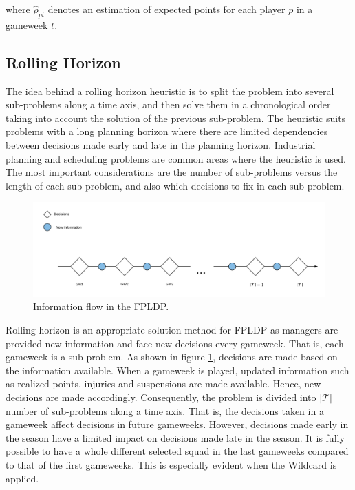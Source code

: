 where $\hat{\rho}_{pt}$ denotes an estimation of expected points for each player $p$ in a gameweek $t$.

\newpar



\subsection{Rolling Horizon}

The idea behind a rolling horizon heuristic is to split the problem into several sub-problems along a time axis, and then solve them in a chronological order taking into account the solution of the previous sub-problem. The heuristic suits problems with a long planning horizon where there are limited dependencies between decisions made early and late in the planning horizon. Industrial planning and scheduling problems are common areas where the heuristic is used. The most important considerations are the number of sub-problems versus the length of each sub-problem, and also which decisions to fix in each sub-problem. 

\begin{figure}[H]
    \centering
    \includegraphics[scale = 0.47]{fig/chapter_5/Rolling_Horizon_Information_Flow.png}
    \caption{Information flow in the FPLDP.}
    \label{fig:information_flow}
\end{figure}

Rolling horizon is an appropriate solution method for FPLDP as managers are provided new information and face new decisions every gameweek. That is, each gameweek is a sub-problem. As shown in figure \ref{fig:information_flow}, decisions are made based on the information available. When a gameweek is played, updated information such as realized points, injuries and suspensions are made available. Hence, new decisions are made accordingly. Consequently, the problem is divided into $\mathcal{|T|}$ number of sub-problems along a time axis. That is, the decisions taken in a gameweek affect decisions in future gameweeks. However, decisions made early in the season have a limited impact on decisions made late in the season. It is fully possible to have a whole different selected squad in the last gameweeks compared to that of the first gameweeks. This is especially evident when the Wildcard is applied.

